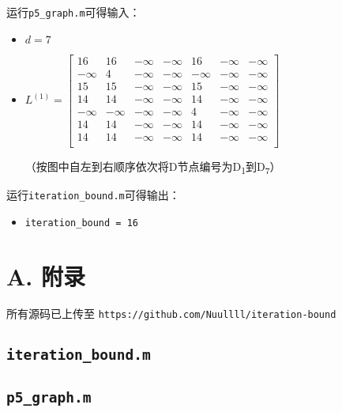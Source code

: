 \documentclass[paper=a4, fontsize=11pt]{scrartcl} %
\begin{document}
运行\texttt{p5\_graph.m}可得输入：
\begin{itemize}
    \item $d=7$
    \item $L^{(1)} = \begin{bmatrix}
        16 & 16 & -\infty & -\infty & 16 & -\infty & -\infty \\
        -\infty & 4 & -\infty & -\infty & -\infty & -\infty & -\infty \\
        15 & 15 & -\infty & -\infty & 15 & -\infty & -\infty \\
        14 & 14 & -\infty & -\infty & 14 & -\infty & -\infty \\
        -\infty & -\infty & -\infty & -\infty & 4 & -\infty & -\infty \\
        14 & 14 & -\infty & -\infty & 14 & -\infty & -\infty \\
        14 & 14 & -\infty & -\infty & 14 & -\infty & -\infty \\
    \end{bmatrix} $

    （按图中自左到右顺序依次将D节点编号为D\textsubscript{1}到D\textsubscript{7}）
\end{itemize}

运行\texttt{iteration\_bound.m}可得输出：
\begin{itemize}
    \item \texttt{iteration\_bound = 16}
\end{itemize}


\newpage
\section*{A. 附录} %
\label{sec:附录}

\small 所有源码已上传至 \texttt{https://github.com/Nuullll/iteration-bound}

\subsection*{\texttt{iteration\_bound.m}} %



\subsection*{\texttt{p5\_graph.m}} %
\end{document}
